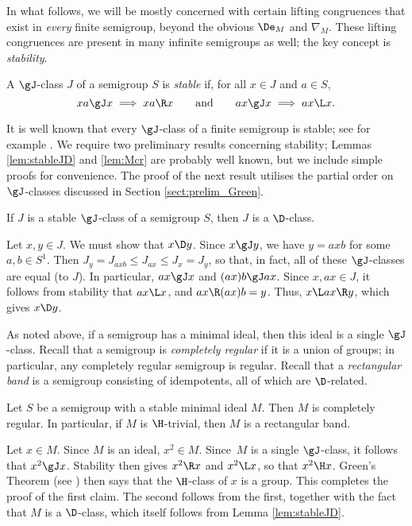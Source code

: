 In what follows, we will be mostly concerned with certain lifting congruences
that exist in \emph{every} finite semigroup, beyond the obvious $\De_M$ and
$\nabla_M$.  These lifting congruences are present in many infinite semigroups as well; the key concept is \emph{stability}.

\begin{defn}\label{defn:stableJ}
A $\gJ$-class $J$ of a semigroup $S$ is \emph{stable} if, for all $x\in J$ and $a\in S$,
\[
xa\gJ x \implies xa\R x \qquad\text{and}\qquad ax\gJ x \implies ax\L x.
\]
\end{defn}

It is well known that every $\gJ$-class of a finite semigroup is stable; see for example \cite[Theorem A.2.4]{RSbook}.  We require two preliminary results concerning stability; Lemmas \ref{lem:stableJD} and \ref{lem:Mcr} are probably well known, but we include simple proofs for convenience.  The proof of the next result utilises the partial order on $\gJ$-classes discussed in Section \ref{sect:prelim_Green}.

\begin{lemma}\label{lem:stableJD}
If $J$ is a stable $\gJ$-class of a semigroup $S$, then $J$ is a $\D$-class.
\end{lemma}

\pf
Let $x,y\in J$.  We must show that $x\D y$.  Since $x\gJ y$, we have $y=axb$ for some $a,b\in S^1$.  Then $J_y = J_{axb} \leq J_{ax} \leq J_x = J_y$, so that, in fact, all of these $\gJ$-classes are equal (to $J$).  In particular, $ax\gJ x$ and $(ax)b\gJ ax$.  Since $x,ax\in J$, it follows from stability that $ax\L x$, and $ax \R (ax)b=y$.  Thus, $x\L ax\R y$, which gives $x\D y$.
\epf

As noted above, if a semigroup has a minimal ideal, then this ideal is a single $\gJ$-class.  Recall that a semigroup is \emph{completely regular} if it is a union of groups; in particular, any completely regular semigroup is regular.  Recall that a \emph{rectangular band} is a semigroup consisting of idempotents, all of which are $\D$-related.

\begin{lemma}\label{lem:Mcr}
Let $S$ be a semigroup with a stable minimal ideal $M$.  Then $M$ is completely regular.  In particular, if $M$ is $\H$-trivial, then $M$ is a rectangular band.
\end{lemma}

\pf 
Let $x\in M$.  Since $M$ is an ideal, $x^2\in M$.  Since~$M$ is a single $\gJ$-class, it follows that $x^2\gJ x$.  Stability then gives $x^2\R x$ and $x^2\L x$, so that $x^2\H x$.  Green's Theorem (see \cite[Theorem 2.2.5]{Howie}) then says that the $\H$-class of $x$ is a group.  This completes the proof of the first claim.  The second follows from the first, together with the fact that $M$ is a $\D$-class, which itself follows from Lemma \ref{lem:stableJD}.
\epf

